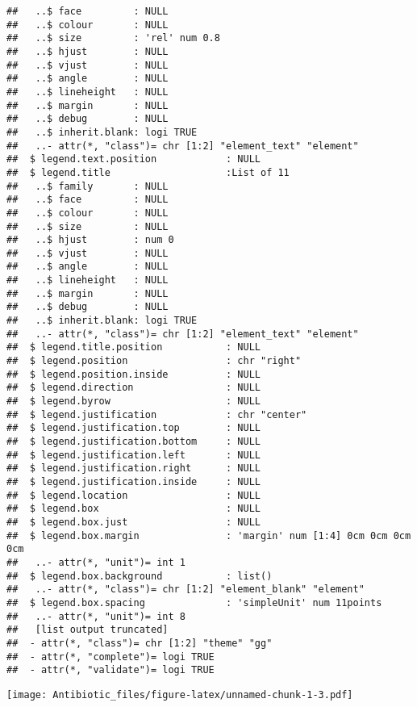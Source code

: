 \documentclass[
]{article}
\begin{document}
\begin{verbatim}
##   ..$ face         : NULL
##   ..$ colour       : NULL
##   ..$ size         : 'rel' num 0.8
##   ..$ hjust        : NULL
##   ..$ vjust        : NULL
##   ..$ angle        : NULL
##   ..$ lineheight   : NULL
##   ..$ margin       : NULL
##   ..$ debug        : NULL
##   ..$ inherit.blank: logi TRUE
##   ..- attr(*, "class")= chr [1:2] "element_text" "element"
##  $ legend.text.position            : NULL
##  $ legend.title                    :List of 11
##   ..$ family       : NULL
##   ..$ face         : NULL
##   ..$ colour       : NULL
##   ..$ size         : NULL
##   ..$ hjust        : num 0
##   ..$ vjust        : NULL
##   ..$ angle        : NULL
##   ..$ lineheight   : NULL
##   ..$ margin       : NULL
##   ..$ debug        : NULL
##   ..$ inherit.blank: logi TRUE
##   ..- attr(*, "class")= chr [1:2] "element_text" "element"
##  $ legend.title.position           : NULL
##  $ legend.position                 : chr "right"
##  $ legend.position.inside          : NULL
##  $ legend.direction                : NULL
##  $ legend.byrow                    : NULL
##  $ legend.justification            : chr "center"
##  $ legend.justification.top        : NULL
##  $ legend.justification.bottom     : NULL
##  $ legend.justification.left       : NULL
##  $ legend.justification.right      : NULL
##  $ legend.justification.inside     : NULL
##  $ legend.location                 : NULL
##  $ legend.box                      : NULL
##  $ legend.box.just                 : NULL
##  $ legend.box.margin               : 'margin' num [1:4] 0cm 0cm 0cm 0cm
##   ..- attr(*, "unit")= int 1
##  $ legend.box.background           : list()
##   ..- attr(*, "class")= chr [1:2] "element_blank" "element"
##  $ legend.box.spacing              : 'simpleUnit' num 11points
##   ..- attr(*, "unit")= int 8
##   [list output truncated]
##  - attr(*, "class")= chr [1:2] "theme" "gg"
##  - attr(*, "complete")= logi TRUE
##  - attr(*, "validate")= logi TRUE
\end{verbatim}

\texttt{[image: Antibiotic\_files/figure-latex/unnamed-chunk-1-3.pdf]}
\end{document}
